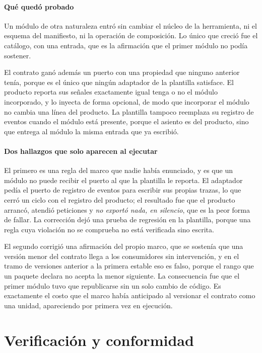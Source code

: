 \paragraph*{Qué quedó probado}

Un módulo de otra naturaleza entró sin cambiar el núcleo de la herramienta, ni
el esquema del manifiesto, ni la operación de composición. Lo único que creció
fue el catálogo, con una entrada, que es la afirmación que el primer módulo no
podía sostener.

El contrato ganó además un puerto con una propiedad que ninguno anterior
tenía, porque es el único que ningún adaptador de la plantilla
satisface. El producto reporta sus señales exactamente igual tenga o no el
módulo incorporado, y lo inyecta de forma opcional, de modo que incorporar el
módulo no cambia una línea del producto. La plantilla tampoco reemplaza su
registro de eventos cuando el módulo está presente, porque el asiento es del
producto, sino que entrega al módulo la misma entrada que ya escribió.

\paragraph*{Dos hallazgos que solo aparecen al ejecutar}

El primero es una regla del marco que nadie había enunciado, y es que un
módulo no puede recibir el puerto al que la plantilla le reporta. El adaptador
pedía el puerto de registro de eventos para escribir sus propias trazas, lo
que cerró un ciclo con el registro del producto; el resultado fue que el
producto arrancó, atendió peticiones y \emph{no exportó nada, en silencio},
que es la peor forma de fallar. La corrección dejó una prueba de regresión en
la plantilla, porque una regla cuya violación no se comprueba no está
verificada sino escrita.

El segundo corrigió una afirmación del propio marco, que se sostenía que una
versión menor del contrato llega a los consumidores sin intervención, y en el
tramo de versiones anterior a la primera estable eso es falso, porque el
rango que un paquete declara no acepta la menor siguiente. La consecuencia
fue que el primer módulo tuvo que republicarse sin un solo cambio de código.
Es exactamente el costo que el marco había anticipado al versionar el
contrato como una unidad, apareciendo por primera vez en ejecución.

\section{Verificación y conformidad}
\label{sec:verificacion-composicion}

